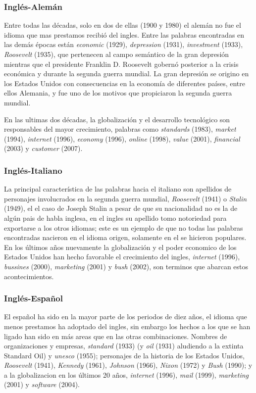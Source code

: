 \subsubsection*{Inglés-Alemán} %
Entre todas las décadas, solo en dos de ellas (1900  y 1980) el alemán no fue
el idioma que mas prestamos recibió  del ingles. Entre las palabras encontradas
en las demás épocas están \textit{economic} (1929), \textit{depression} (1931),
\textit{investment} (1933), \textit{Roosevelt} (1935), que pertenecen al campo
semántico de la gran depresión mientras que el presidente Franklin D. Roosevelt
gobernó posterior a la crisis económica y durante la segunda guerra mundial. La
gran depresión se origino en los Estados Unidos con consecuencias en la
economía de diferentes países, entre ellos  Alemania, y fue uno de los motivos
que propiciaron la segunda guerra mundial.

En las ultimas dos décadas, la globalización y  el desarrollo tecnológico son
responsables del mayor crecimiento, palabras como \textit{standards} (1983),
\textit{market} (1994), \textit{internet} (1996), \textit{economy} (1996),
\textit{online} (1998), \textit{value} (2001), \textit{financial} (2003) y
\textit{customer} (2007). 
\subsubsection*{Inglés-Italiano} %
La principal característica de las palabras hacia el italiano son apellidos de
personajes involucrados en la segunda guerra mundial, \textit{Roosevelt} (1941)
o \textit{Stalin} (1949), el el caso de Joseph Stalin a pesar de que su
nacionalidad no es la de algún pais de habla inglesa, en el ingles su apellido
tomo notoriedad para exportarse a los otros idiomas; este es un ejemplo de que
no todas las palabras encontradas nacieron en el idioma origen,  solamente en
el se hicieron populares.  En los últimos años nuevamente la globalización y el
poder economico de los Estados Unidos han hecho favorable el crecimiento del
ingles, \textit{internet} (1996), \textit{bussines} (2000), \textit{marketing}
(2001) y \textit{bush} (2002), son terminos que abarcan estos acontecimientos. 
\subsubsection*{Inglés-Español} %
El español ha sido en la mayor parte de los periodos de diez años,  el idioma
que menos prestamos ha adoptado del ingles, sin embargo los hechos a los que se
han ligado han sido en más areas que en las otras combinaciones.  Nombres de
organizaciones y empresas,  \textit{standard} (1933) (y \textit{oil} (1931)
aludiendo a la extinta Standard Oil) y \textit{unesco} (1955);  personajes de
la historia de los Estados Unidos,  \textit{Roosevelt} (1941), \textit{Kennedy}
(1961), \textit{Johnson} (1966),  \textit{Nixon} (1972) y \textit{Bush} (1990);
y a la globalizacion en los últimos 20 años, \textit{internet} (1996),
\textit{mail} (1999), \textit{marketing} (2001) y \textit{software} (2004).   

